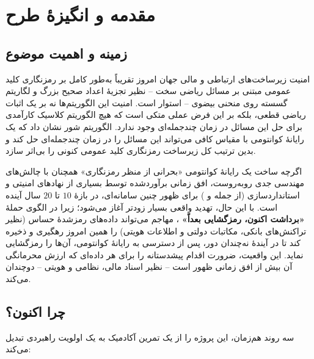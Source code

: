\chapter{مقدمه و انگیزهٔ طرح}

\section{زمینه و اهمیت موضوع}

امنیت زیرساخت‌های ارتباطی و مالی جهان امروز تقریباً به‌طور کامل بر رمزنگاری کلید عمومی مبتنی بر مسائل ریاضی سخت -- نظیر تجزیهٔ اعداد صحیح بزرگ  و لگاریتم گسسته روی منحنی بیضوی  -- استوار است. امنیت این الگوریتم‌ها نه بر یک اثبات ریاضی قطعی، بلکه بر این فرض عملی متکی است که هیچ الگوریتم کلاسیک کارآمدی برای حل این مسائل در زمان چندجمله‌ای وجود ندارد. الگوریتم شور  نشان داد که یک رایانهٔ کوانتومی با مقیاس کافی می‌تواند این مسائل را در زمان چندجمله‌ای حل کند و بدین ترتیب کل زیرساخت رمزنگاری کلید عمومی کنونی را بی‌اثر سازد.

اگرچه ساخت یک رایانهٔ کوانتومی «بحرانی از منظر رمزنگاری»  همچنان با چالش‌های مهندسی جدی روبه‌روست، افق زمانی برآوردشده توسط بسیاری از نهادهای امنیتی و استانداردسازی (از جمله  و ) برای ظهور چنین سامانه‌ای، در بازهٔ $10$ تا $20$ سال آینده است. با این حال، تهدید واقعی بسیار زودتر آغاز می‌شود؛ زیرا در الگوی حملهٔ \textbf{«برداشت اکنون، رمزگشایی بعداً»} ، مهاجم می‌تواند داده‌های رمزشدهٔ حساس (نظیر تراکنش‌های بانکی، مکاتبات دولتی و اطلاعات هویتی) را همین امروز رهگیری و ذخیره کند تا در آیندهٔ نه‌چندان دور، پس از دسترسی به رایانهٔ کوانتومی، آن‌ها را رمزگشایی نماید. این واقعیت، ضرورت اقدام پیشدستانه را برای هر داده‌ای که ارزش محرمانگی آن بیش از افق زمانی ظهور  است -- نظیر اسناد مالی، نظامی و هویتی -- دوچندان می‌کند.

\section{چرا اکنون؟}

سه روند هم‌زمان، این پروژه را از یک تمرین آکادمیک به یک اولویت راهبردی تبدیل می‌کند:

